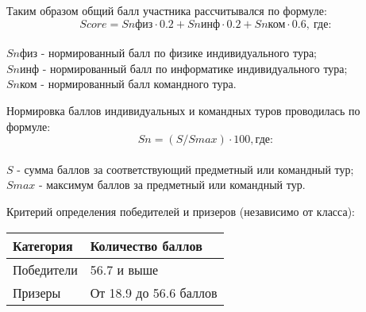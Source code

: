 Таким образом общий балл участника рассчитывался по формуле: 
$$Score = Sn\text{физ} \cdot 0.2 + Sn\text{инф} \cdot 0.2 + Sn\text{ком} \cdot 0.6, \: \text{где}:$$\\
$Sn\text{физ}$ - нормированный балл по физике индивидуального тура;\\
$Sn\text{инф}$ - нормированный балл по информатике индивидуального тура;\\
$Sn\text{ком}$ - нормированный балл командного тура.

Нормировка баллов индивидуальных и командных туров проводилась по формуле: $$Sn = (S / Smax) \cdot 100, \text{где}:$$\\
$S$ - сумма баллов за соответствующий предметный или командный тур;\\
$Smax$ - максимум баллов за предметный или командный тур.

Критерий определения победителей и призеров (независимо от класса):
\begin{center}
    \begin{tabular}{|l|l|}
        \hline
        Категория & Количество баллов \\
        \hline
        Победители & 56.7 и выше \\
        \hline
        Призеры	& От 18.9 до 56.6 баллов \\
        \hline
    \end{tabular}
\end{center}